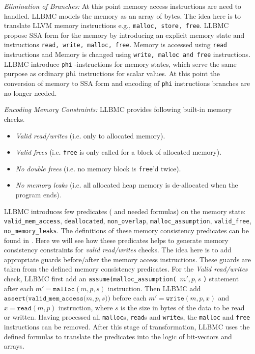 \documentclass[14pt]{article}
\begin{document}
{\par \textit{Elimination of Branches:} At this point memory access instructions are need to handled. LLBMC models the memory as an array of bytes. The idea here is to translate LLVM memory instructions e.g.,  \texttt{malloc, store, free}. LLBMC propose SSA form for the memory by introducing an explicit memory state and instructions \texttt{read, write, malloc, free}. Memory is accessed using \texttt{read} instructions and Memory is changed using \texttt{write, malloc and free} instructions. LLBMC introduce \texttt{phi} -instructions for memory states, which serve the same purpose as ordinary \texttt{phi} instructions for scalar values. At this point the conversion of memory to SSA form and  encoding of \texttt{phi} instructions branches are no longer needed.

\par \textit{Encoding Memory Constraints:} LLBMC provides following built-in memory checks. 
\begin{itemize}
  \item \textit{Valid read/writes } (i.e. only to allocated memory).
  \item \textit{Valid frees} (i.e. \texttt{free} is only called for a block of allocated memory).
  \item \textit{No double frees} (i.e. no memory block is  \texttt{free}'d twice).
  \item \textit{No memory leaks} (i.e. all allocated heap memory is de-allocated when the program ends).
\end{itemize}
LLBMC introduces few predicates ( and needed formulas) on the memory state: 
  \texttt{valid\_mem\_access},
  \texttt{deallocated},
  \texttt{non\_overlap},
  \texttt{malloc\_assumption},
  \texttt{valid\_free},
  \texttt{no\_memory\_leaks}. The definitions of these memory consistency predicates can be found in \cite{llbmc2}. Here we will see how these predicates helps to generate memory consistency constraints for \textit{valid read/writes } checks. The idea here is to add appropriate guards before/after the memory access instructions. These guards are taken from the defined memory consistency predicates. For the \textit{Valid read/writes } check, LLBMC first add an \texttt{assume(malloc\_assumption( }\(m', p, s\) \texttt{)} statement after each \(m' = \texttt{malloc}(m, p, s)\) instruction. Then LLBMC add \(\texttt{assert(valid\_mem\_access(}m, p, s\texttt{))}\) before each \( m' = \texttt{write}(m, p, x)\) and \( x = \texttt{read}(m, p)\) instruction, where  \(s\) is the size in bytes of the data to be read or written. Having processed all \texttt{malloc}s, \texttt{read}s and \texttt{write}s, the \texttt{malloc} and \texttt{free} instructions can be removed. After this stage of transformation, LLBMC uses the defined formulas to translate the predicates into the logic of bit-vectors and arrays.
  
}
\end{document}
